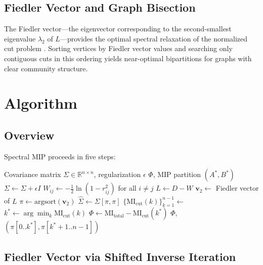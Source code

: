 \documentclass[10pt,letterpaper]{article}
\begin{document}
\subsection{Fiedler Vector and Graph Bisection}

The Fiedler vector---the eigenvector corresponding to the second-smallest eigenvalue $\lambda_2$ of $L$---provides the optimal spectral relaxation of the normalized cut problem \citep{fiedler1973}. Sorting vertices by Fiedler vector values and searching only contiguous cuts in this ordering yields near-optimal bipartitions for graphs with clear community structure.

\section{Algorithm}

\subsection{Overview}

Spectral MIP proceeds in five steps:

\begin{algorithm}[H]
\caption{Spectral MIP Finder}
\begin{algorithmic}[1]
\Require Covariance matrix $\Sigma \in \mathbb{R}^{n \times n}$, regularization $\epsilon$
\Ensure $\Phi$, MIP partition $(A^*, B^*)$
\State $\Sigma \leftarrow \Sigma + \epsilon I$ 
\State $W_{ij} \leftarrow -\frac{1}{2}\ln(1 - r_{ij}^2)$ for all $i \neq j$ 
\State $L \leftarrow D - W$ 
\State $\mathbf{v}_2 \leftarrow$ Fiedler vector of $L$ 
\State $\pi \leftarrow \text{argsort}(\mathbf{v}_2)$ 
\State $\hat{\Sigma} \leftarrow \Sigma[\pi, \pi]$ 
\State $\{\text{MI}_{\text{cut}}(k)\}_{k=1}^{n-1} \leftarrow$ 
\State $k^* \leftarrow \arg\min_k \text{MI}_{\text{cut}}(k)$
\State $\Phi \leftarrow \text{MI}_{\text{total}} - \text{MI}_{\text{cut}}(k^*)$
\State \Return $\Phi$, $(\pi[0..k^*], \pi[k^*\!+\!1..n\!-\!1])$
\end{algorithmic}
\end{algorithm}

\subsection{Fiedler Vector via Shifted Inverse Iteration}
\end{document}
